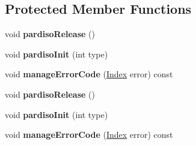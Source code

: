 \subsection*{Protected Member Functions}
\begin{DoxyCompactItemize}
\item 
\mbox{\label{class_eigen_1_1_pardiso_impl_aa480e5ca316d25bb2b556ed5473ab0de}} 
void {\bfseries pardiso\+Release} ()
\item 
\mbox{\label{class_eigen_1_1_pardiso_impl_a4d13fa79acda71b1164e07d61156462f}} 
void {\bfseries pardiso\+Init} (int type)
\item 
\mbox{\label{class_eigen_1_1_pardiso_impl_ad34dfcda0a66d31a68b12bb8fc28f504}} 
void {\bfseries manage\+Error\+Code} (\hyperlink{namespace_eigen_a62e77e0933482dafde8fe197d9a2cfde}{Index} error) const
\item 
\mbox{\label{class_eigen_1_1_pardiso_impl_aa480e5ca316d25bb2b556ed5473ab0de}} 
void {\bfseries pardiso\+Release} ()
\item 
\mbox{\label{class_eigen_1_1_pardiso_impl_a4d13fa79acda71b1164e07d61156462f}} 
void {\bfseries pardiso\+Init} (int type)
\item 
\mbox{\label{class_eigen_1_1_pardiso_impl_ad34dfcda0a66d31a68b12bb8fc28f504}} 
void {\bfseries manage\+Error\+Code} (\hyperlink{namespace_eigen_a62e77e0933482dafde8fe197d9a2cfde}{Index} error) const
\end{DoxyCompactItemize}

